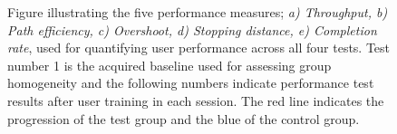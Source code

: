 \begin{figure}[H] 
	\hspace{-0.5cm}
	\hspace{-0.5cm}
	\hspace{-0.5cm}
	\hspace{-0.5cm}
	\caption{Figure illustrating the five performance measures; \textit{ a) Throughput, b) Path efficiency, c) Overshoot, d) Stopping distance, e) Completion rate}, used for quantifying user performance across all four tests.  Test number 1 is the acquired baseline used for assessing group homogeneity and the following numbers indicate performance test results after user training in each session. The red line indicates the progression of the test group and the blue of the control group.}
	\label{thereIsnoFigRefYet}
	
\end{figure}
	

